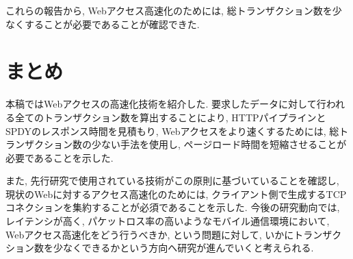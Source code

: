 \documentclass[twocolumn]{jsarticle}
\begin{document}
これらの報告から, Webアクセス高速化のためには, 総トランザクション数を少なくすることが必要であることが確認できた.
\section{まとめ}
本稿ではWebアクセスの高速化技術を紹介した.
要求したデータに対して行われる全てのトランザクション数を算出することにより, HTTPパイプラインとSPDYのレスポンス時間を見積もり,
Webアクセスをより速くするためには, 総トランザクション数の少ない手法を使用し, ページロード時間を短縮させることが必要であることを示した.

また, 先行研究で使用されている技術がこの原則に基づいていることを確認し, 現状のWebに対するアクセス高速化のためには,
クライアント側で生成するTCPコネクションを集約することが必須であることを示した.
今後の研究動向では, レイテンシが高く, パケットロス率の高いようなモバイル通信環境において, Webアクセス高速化をどう行うべきか, という問題に対して,
いかにトランザクション数を少なくできるかという方向へ研究が進んでいくと考えられる.
\end{document}
